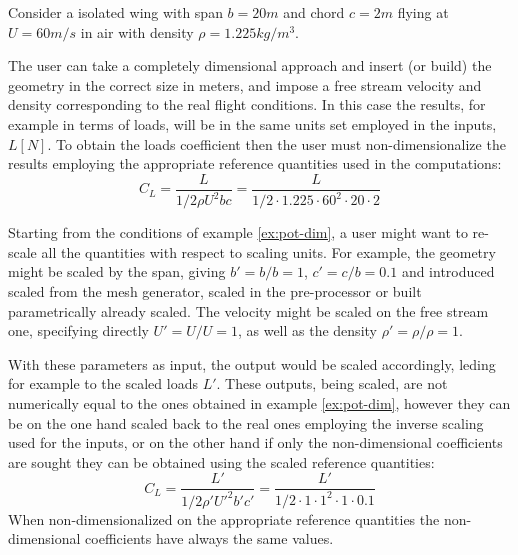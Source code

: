 \begin{example}
\label{ex:pot-dim}
Consider a isolated wing with span $b = 20 m$ and chord $c = 2 m$ flying at 
$U = 60 m/s$ in air with density $\rho = 1.225 kg/m^3$. 

The user can take a completely dimensional approach and insert (or build) 
the geometry in the correct size in meters, and impose a free stream velocity 
and density corresponding to the real flight conditions. In this case the results, 
for example in terms of loads, will be in the same units set employed in the inputs, 
$L [N]$. To obtain the loads coefficient then the user must non-dimensionalize the 
results employing the appropriate reference quantities used in the computations:
\begin{equation*}
    C_L = \frac{L}{1/2 \rho U^2 b c} = \frac{L}{1/2 \cdot 1.225  \cdot 60^2 \cdot 20 \cdot 2}
\end{equation*}
\end{example}

\begin{example}
\label{ex:pot-nondim}
Starting from the conditions of example \ref{ex:pot-dim}, a user might want 
to re-scale all the quantities with respect to scaling units. For example, 
the geometry might be scaled by the span, giving $b' = b/b = 1$, $c'=c/b=0.1$ 
and introduced scaled from the mesh generator, scaled in the pre-processor or 
built parametrically already scaled. The velocity might be scaled on the free 
stream one, specifying directly $U'=U/U=1$, as well as the density $\rho' = \rho/\rho = 1$. 

With these parameters as input, the output would be scaled accordingly, 
leding for example to the scaled loads $L'$. These outputs, being scaled, 
are not numerically equal to the ones obtained in example \ref{ex:pot-dim}, 
however they can be on the one hand scaled back to the real ones employing 
the inverse scaling used for the inputs, or on the other hand if only the 
non-dimensional coefficients are sought they can be obtained using the scaled 
reference quantities:
\begin{equation*}
    C_L = \frac{L'}{1/2 \rho' U'^2 b' c'} = \frac{L'}{1/2 \cdot 1  \cdot 1^2 \cdot 1 \cdot 0.1}
\end{equation*}
When non-dimensionalized on the appropriate reference quantities the 
non-dimensional coefficients have always the same values.
\end{example}

